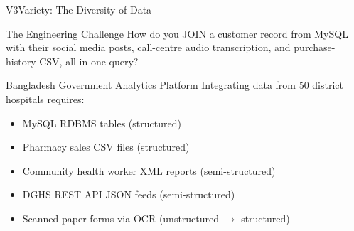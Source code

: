 \documentclass[aspectratio=169,10pt]{beamer}
\begin{document}
\begin{frame}{V3\textemdash Variety: The Diversity of Data}

      \begin{alertblock}{The Engineering Challenge}
        How do you JOIN a customer record from MySQL with their social media posts, call-centre audio transcription, and purchase-history CSV, all in one query?
      \end{alertblock}
      \vspace{6pt}
      \begin{exampleblock}{Bangladesh Government Analytics Platform}
        Integrating data from 50 district hospitals requires:
        \vspace{2pt}
        \begin{itemize}
          \small
          \item MySQL RDBMS tables (structured)
          \item Pharmacy sales CSV files (structured)
          \item Community health worker XML reports (semi-structured)
          \item DGHS REST API JSON feeds (semi-structured)
          \item Scanned paper forms via OCR (unstructured $\to$ structured)
        \end{itemize}
      \end{exampleblock}
\end{frame}
\end{document}
